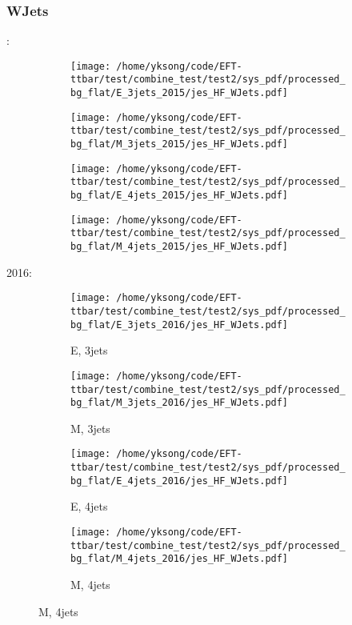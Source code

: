 \documentclass{beamer}
\begin{document}
\begin{frame}
\frametitle{WJets}
\fontsize{5}{1}:
\begin{figure}
\centering
\begin{subfigure}[b]{0.24\textwidth}
\texttt{[image: /home/yksong/code/EFT-ttbar/test/combine\_test/test2/sys\_pdf/processed\_bg\_flat/E\_3jets\_2015/jes\_HF\_WJets.pdf]}
\end{subfigure}
\begin{subfigure}[b]{0.24\textwidth}
\texttt{[image: /home/yksong/code/EFT-ttbar/test/combine\_test/test2/sys\_pdf/processed\_bg\_flat/M\_3jets\_2015/jes\_HF\_WJets.pdf]}
\end{subfigure}
\begin{subfigure}[b]{0.24\textwidth}
\texttt{[image: /home/yksong/code/EFT-ttbar/test/combine\_test/test2/sys\_pdf/processed\_bg\_flat/E\_4jets\_2015/jes\_HF\_WJets.pdf]}
\end{subfigure}
\begin{subfigure}[b]{0.24\textwidth}
\texttt{[image: /home/yksong/code/EFT-ttbar/test/combine\_test/test2/sys\_pdf/processed\_bg\_flat/M\_4jets\_2015/jes\_HF\_WJets.pdf]}
\end{subfigure}
\end{figure}
2016:
\begin{figure}
\centering
\begin{subfigure}[b]{0.24\textwidth}
\texttt{[image: /home/yksong/code/EFT-ttbar/test/combine\_test/test2/sys\_pdf/processed\_bg\_flat/E\_3jets\_2016/jes\_HF\_WJets.pdf]}
\captionsetup{font=tiny}
\caption{E, 3jets}
\end{subfigure}
\begin{subfigure}[b]{0.24\textwidth}
\texttt{[image: /home/yksong/code/EFT-ttbar/test/combine\_test/test2/sys\_pdf/processed\_bg\_flat/M\_3jets\_2016/jes\_HF\_WJets.pdf]}
\captionsetup{font=tiny}
\caption{M, 3jets}
\end{subfigure}
\begin{subfigure}[b]{0.24\textwidth}
\texttt{[image: /home/yksong/code/EFT-ttbar/test/combine\_test/test2/sys\_pdf/processed\_bg\_flat/E\_4jets\_2016/jes\_HF\_WJets.pdf]}
\captionsetup{font=tiny}
\caption{E, 4jets}
\end{subfigure}
\begin{subfigure}[b]{0.24\textwidth}
\texttt{[image: /home/yksong/code/EFT-ttbar/test/combine\_test/test2/sys\_pdf/processed\_bg\_flat/M\_4jets\_2016/jes\_HF\_WJets.pdf]}
\captionsetup{font=tiny}
\caption{M, 4jets}
\end{subfigure}
\end{figure}
\end{frame}
\end{document}
